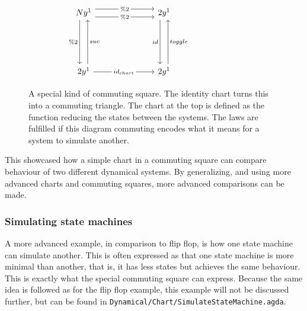 \begin{figure}[H]

\[\begin{tikzcd}
	{Ny^1} &&& {2y^1} &&& {} \\
	\\
	\\
	{2y^1} &&& {2y^1}
	\arrow["{\% 2}"', shift right=2, from=1-1, to=4-1]
	\arrow["suc"', shift right=2, from=4-1, to=1-1]
	\arrow["id"', shift right=2, from=1-4, to=4-4]
	\arrow["toggle"', shift right=2, from=4-4, to=1-4]
	\arrow["{id_{chart}}"{description}, from=4-1, to=4-4]
	\arrow["{\% 2}"{description}, shift left=2, from=1-1, to=1-4]
	\arrow["{\%2}"{description}, shift right=2, from=1-1, to=1-4]
\end{tikzcd}\]

    \caption{A special kind of commuting square. The identity chart turns this into a commuting triangle. The chart at the top is defined as the function reducing the states between the systems. The laws are fulfilled if this diagram commuting encodes what it means for a system to simulate another.}
    \label{fig:flipFlopSquare}

\end{figure}

This showcased how a simple chart in a commuting square can compare behaviour of two different dynamical systems. By generalizing, and using more advanced charts and commuting squares, more advanced comparisons can be made.

\subsubsection{Simulating state machines}\label{section:simulatestatemachine}
A more advanced example, in comparison to flip flop, is how one state machine can simulate another. This is often expressed as that one state machine is more minimal than another, that is, it has less states but achieves the same behaviour. This is exactly what the special commuting square can express. Because the same idea is followed as for the flip flop example, this example will not be discussed further, but can be found in \texttt{Dynamical/Chart/SimulateStateMachine.agda}.

